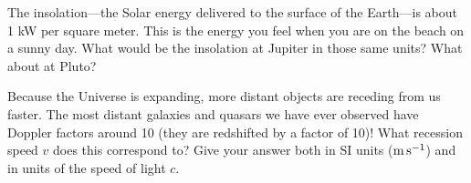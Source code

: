 \documentclass[12pt, letterpaper]{article}
\begin{document}
\begin{problem}
The insolation---the Solar energy delivered to the surface of the
Earth---is about 1 kW per square meter. This is the energy you feel
when you are on the beach on a sunny day. What would be the insolation
at Jupiter in those same units?  What about at Pluto?
\end{problem}

\begin{problem}
Because the Universe is expanding, more distant objects are receding from us faster.
The most distant galaxies and quasars we have ever observed have Doppler factors
around 10 (they are redshifted by a factor of 10)!
What recession speed $v$ does this correspond to?
Give your answer both in SI units ($\mathrm{m}\,\mathrm{s}^{-1}$) and in units of the speed of light $c$.
\end{problem}
\end{document}
